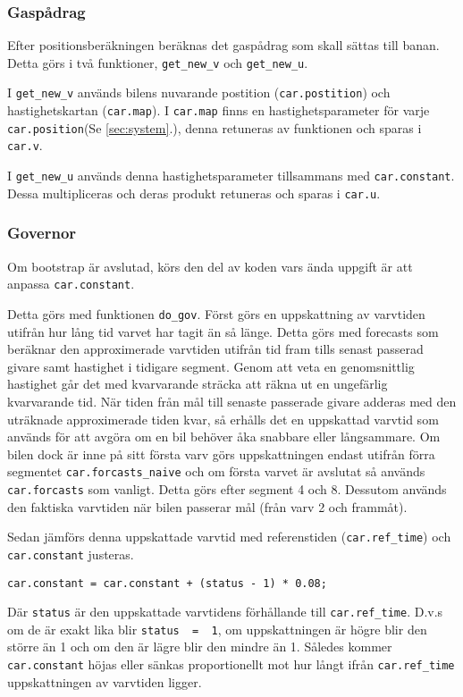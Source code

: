 \subsubsection{Gaspådrag}

Efter positionsberäkningen beräknas det gaspådrag som skall sättas till banan. Detta görs i två
funktioner, \texttt{get\_new\_v} och \texttt{get\_new\_u}.
 
I \texttt{get\_new\_v} används bilens nuvarande postition (\texttt{car.postition})
och hastighetskartan (\texttt{car.map}). I \texttt{car.map} finns en
hastighetsparameter för varje \texttt{car.position}(Se \ref{sec:system}.), denna retuneras av funktionen
och sparas i \texttt{car.v}.
 
I \texttt{get\_new\_u} används denna hastighetsparameter tillsammans med
\texttt{car.constant}. Dessa multipliceras och deras produkt retuneras och sparas
i \texttt{car.u}.

\subsubsection{Governor}
\label{sec:systembeskrivning:governor}
Om bootstrap är avslutad, körs den del av koden vars ända uppgift är att 
anpassa \texttt{car.constant}. 

Detta görs med funktionen \texttt{do\_gov}.  Först görs en uppskattning av 
varvtiden utifrån hur lång tid varvet har tagit än
så länge. Detta görs med forecasts som beräknar den approximerade varvtiden utifrån tid fram tills senast
passerad givare samt hastighet i tidigare segment. Genom att veta en
genomsnittlig hastighet går det med kvarvarande sträcka att räkna ut en
ungefärlig kvarvarande tid. När tiden från mål till senaste passerade givare adderas med
den uträknade approximerade tiden kvar, så erhålls det en uppskattad varvtid som
används för att avgöra om en bil behöver åka snabbare eller långsammare. Om bilen dock är inne på sitt första varv görs uppskattningen endast
utifrån förra segmentet \texttt{car.forcasts\_naive} och om första varvet är
avslutat så används \texttt{car.forcasts} som vanligt. Detta görs efter segment 4 och 8. Dessutom används den
faktiska varvtiden när bilen passerar mål (från varv 2 och frammåt).
 
Sedan jämförs denna uppskattade varvtid med referenstiden (\texttt{car.ref\_time}) 
och \texttt{car.constant} justeras.
\begin{verbatim}
car.constant = car.constant + (status - 1) * 0.08;
\end{verbatim}
Där \texttt{status} är den uppskattade varvtidens förhållande till \texttt{car.ref\_time}.
D.v.s om de är exakt lika blir \texttt{status~ =~ 1}, om uppskattningen är högre blir
den större än 1 och om den är lägre blir den mindre än 1. Således kommer \texttt{car.constant}
höjas eller sänkas proportionellt mot hur långt ifrån \texttt{car.ref\_time} uppskattningen
av varvtiden ligger. 

